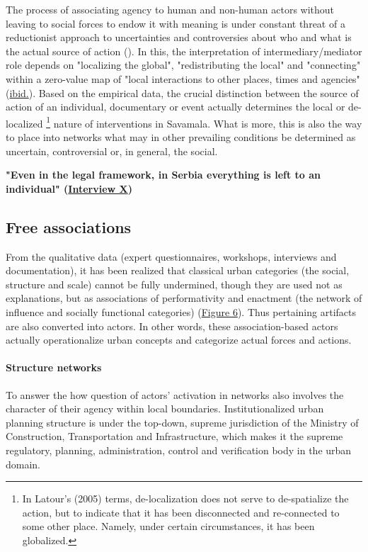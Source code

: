 \documentclass[11pt]{report}
\begin{document}
The process of associating agency to human and non-human actors without leaving to social forces to endow it with meaning is under constant threat of a reductionist approach to uncertainties and controversies about who and what is the actual source of action (\href{Latour}{\citealt{latour_reassembling_2005}}).
In this, the interpretation of intermediary/mediator role depends on "localizing the global", "redistributing the local" and "connecting" within a zero-value map of "local interactions to other places, times and agencies" (\href{Latour}{ibid.}).
Based on the empirical data, the crucial distinction between the source of action of an individual, documentary or event actually determines the local or de-localized
\footnote{In Latour's (2005) terms, de-localization does not serve to de-spatialize the action, but to indicate that it has been disconnected and re-connected to some other place. Namely, under certain circumstances, it has been globalized.}
nature of interventions in Savamala.
What is more, this is also the way to place into networks what may in other prevailing conditions be determined as uncertain, controversial or, in general, the social.

\textbf{"Even in the legal framework, in Serbia everything is left to an individual" (\href{InterviewX}{Interview X})}

\subsection{Free associations}

From the qualitative data (expert questionnaires, workshops, interviews and documentation), it has been realized that classical urban categories (the social, structure and scale) cannot be fully undermined, though they are used not as explanations, but as associations of performativity and enactment (the network of influence and socially functional categories)  (\href{ref}{Figure 6}).
Thus pertaining artifacts are also converted into actors.
In other words, these association-based actors actually operationalize urban concepts and categorize actual forces and actions.

\paragraph{Structure networks}

To answer the how question of actors' activation in networks also involves the character of their agency within local boundaries.
Institutionalized urban planning structure is under the top-down, supreme jurisdiction of the Ministry of Construction, Transportation and Infrastructure, which makes it the supreme regulatory, planning, administration, control and verification body in the urban domain.
\\
\end{document}
